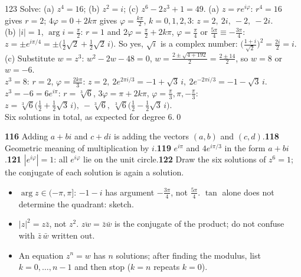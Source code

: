 \begin{bookex}{123}
Solve: (a) $z^4=16$; (b) $z^2=i$; (c) $z^6-2z^3+1=49$.
\solution
(a) $z=re^{i\varphi}$: $r^4=16$ gives $r=2$; $4\varphi=0+2k\pi$ gives $\varphi=\frac{k\pi}2$, $k=0,1,2,3$: $z=2,\ 2i,\ -2,\ -2i$.\\
(b) $|i|=1$, $\arg i=\frac\pi2$: $r=1$ and $2\varphi=\frac\pi2+2k\pi$, $\varphi=\frac\pi4$ or $\frac{5\pi}4\equiv-\frac{3\pi}4$: $z=\pm e^{i\pi/4}=\pm\big(\tfrac12\sqrt2+\tfrac12\sqrt2\,i\big)$. So yes, $\sqrt i$ is a complex number: $\big(\frac{1+i}{\sqrt2}\big)^2=\frac{2i}2=i$.\\
(c) Substitute $w=z^3$: $w^2-2w-48=0$, $w=\frac{2\pm\sqrt{4+192}}2=\frac{2\pm14}2$, so $w=8$ or $w=-6$.\\
$z^3=8$: $r=2$, $\varphi=\frac{2k\pi}3$: $z=2,\ 2e^{2\pi i/3}=-1+\sqrt3\,i,\ 2e^{-2\pi i/3}=-1-\sqrt3\,i$.\\
$z^3=-6=6e^{i\pi}$: $r=\sqrt[3]6$, $3\varphi=\pi+2k\pi$, $\varphi=\frac\pi3,\pi,-\frac\pi3$: $z=\sqrt[3]6\big(\tfrac12+\tfrac12\sqrt3\,i\big),\ -\sqrt[3]6,\ \sqrt[3]6\big(\tfrac12-\tfrac12\sqrt3\,i\big)$.\\
Six solutions in total, as expected for degree $6$.\qed
\end{bookex}

\begin{trybox}[{116, 118, 119, 121, 122}]
\textbf{116} Adding $a+bi$ and $c+di$ is adding the vectors $(a,b)$ and $(c,d)$.\quad \textbf{118} Geometric meaning of multiplication by $i$.\quad \textbf{119} $e^{i\pi}$ and $4e^{i\pi/3}$ in the form $a+bi$.\quad \textbf{121} $|e^{i\varphi}|=1$: all $e^{i\varphi}$ lie on the unit circle.\quad \textbf{122} Draw the six solutions of $z^6=1$; the conjugate of each solution is again a solution.
\end{trybox}

\begin{warn}
\begin{itemize}
\item $\arg z\in(-\pi,\pi]$: $-1-i$ has argument $-\frac{3\pi}4$, not $\frac{5\pi}4$. $\tan$ alone does not determine the quadrant: sketch.
\item $|z|^2=z\bar z$, not $z^2$. $\overline{zw}=\bar z\bar w$ is the conjugate of the product; do not confuse with $\bar z\,\bar w$ written out.
\item An equation $z^n=w$ has $n$ solutions; after finding the modulus, list $k=0,\dots,n-1$ and then stop ($k=n$ repeats $k=0$).
\end{itemize}
\end{warn}
